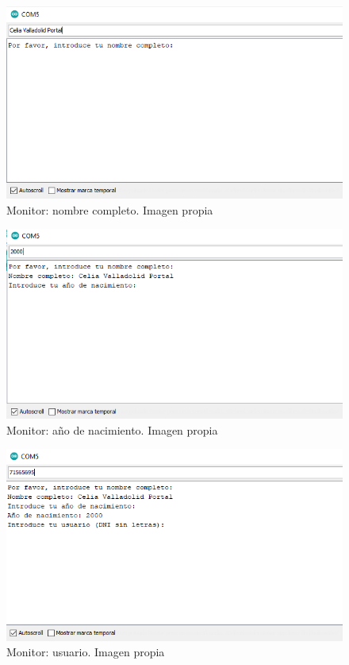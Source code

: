  \begin{figure}[H]
    \centering
    \includegraphics[width=1.1\textwidth]{img/monitornombre.PNG}
    \caption{Monitor: nombre completo. Imagen propia }
    \label{fig:monitorNOMBRE}
\end{figure}

 \begin{figure}[H]
    \centering
    \includegraphics[width=1.1\textwidth]{img/monitoraño.PNG}
    \caption{Monitor: año de nacimiento. Imagen propia }
    \label{fig:monitorAÑO}
\end{figure}

 \begin{figure}[H]
    \centering
    \includegraphics[width=1.1\textwidth]{img/monitorusuario.PNG}
    \caption{Monitor: usuario. Imagen propia }
    \label{fig:monitorUSUARIO}
\end{figure}

